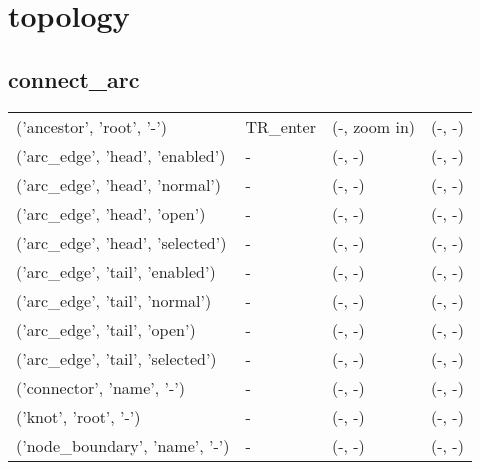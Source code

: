 \def\state#1{#1}
\def\object#1{#1}
\def\cursor#1{#1}
\def\leftnextstate#1{#1}
\def\leftaction#1{#1}
\def\rightnextstate#1{#1}
\def\rightaction#1{#1}
\section{topology}
\subsection{connect\_arc}
\begin{tabular}{|l|l|l|l|}
\object{('ancestor', 'root', '-')} &\cursor{TR\_enter} &(\leftnextstate{-}, \leftaction{zoom in}) &(\rightnextstate{-}, \rightaction{-})\\
\object{('arc\_edge', 'head', 'enabled')} &\cursor{-} &(\leftnextstate{-}, \leftaction{-}) &(\rightnextstate{-}, \rightaction{-})\\
\object{('arc\_edge', 'head', 'normal')} &\cursor{-} &(\leftnextstate{-}, \leftaction{-}) &(\rightnextstate{-}, \rightaction{-})\\
\object{('arc\_edge', 'head', 'open')} &\cursor{-} &(\leftnextstate{-}, \leftaction{-}) &(\rightnextstate{-}, \rightaction{-})\\
\object{('arc\_edge', 'head', 'selected')} &\cursor{-} &(\leftnextstate{-}, \leftaction{-}) &(\rightnextstate{-}, \rightaction{-})\\
\object{('arc\_edge', 'tail', 'enabled')} &\cursor{-} &(\leftnextstate{-}, \leftaction{-}) &(\rightnextstate{-}, \rightaction{-})\\
\object{('arc\_edge', 'tail', 'normal')} &\cursor{-} &(\leftnextstate{-}, \leftaction{-}) &(\rightnextstate{-}, \rightaction{-})\\
\object{('arc\_edge', 'tail', 'open')} &\cursor{-} &(\leftnextstate{-}, \leftaction{-}) &(\rightnextstate{-}, \rightaction{-})\\
\object{('arc\_edge', 'tail', 'selected')} &\cursor{-} &(\leftnextstate{-}, \leftaction{-}) &(\rightnextstate{-}, \rightaction{-})\\
\object{('connector', 'name', '-')} &\cursor{-} &(\leftnextstate{-}, \leftaction{-}) &(\rightnextstate{-}, \rightaction{-})\\
\object{('knot', 'root', '-')} &\cursor{-} &(\leftnextstate{-}, \leftaction{-}) &(\rightnextstate{-}, \rightaction{-})\\
\object{('node\_boundary', 'name', '-')} &\cursor{-} &(\leftnextstate{-}, \leftaction{-}) &(\rightnextstate{-}, \rightaction{-})\\

\end{tabular}
